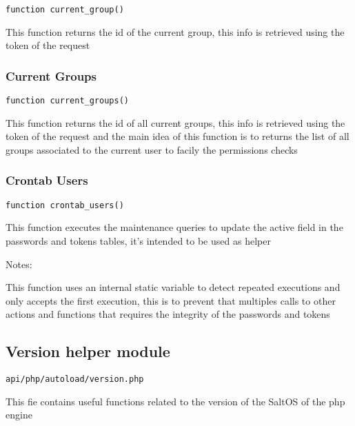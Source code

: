 \documentclass[a4paper]{article}
\begin{document}
\begin{lstlisting}
function current_group()
\end{lstlisting}

This function returns the id of the current group, this info is retrieved
using the token of the request

\hypertarget{toc265}{}
\subsubsection{Current Groups}

\begin{lstlisting}
function current_groups()
\end{lstlisting}

This function returns the id of all current groups, this info is retrieved
using the token of the request and the main idea of this function is to
returns the list of all groups associated to the current user to facily the
permissions checks

\hypertarget{toc266}{}
\subsubsection{Crontab Users}

\begin{lstlisting}
function crontab_users()
\end{lstlisting}

This function executes the maintenance queries to update the active field
in the passwords and tokens tables, it's intended to be used as helper

Notes:

This function uses an internal static variable to detect repeated executions
and only accepts the first execution, this is to prevent that multiples calls
to other actions and functions that requires the integrity of the passwords
and tokens

\hypertarget{toc267}{}
\subsection{Version helper module}

\begin{lstlisting}
api/php/autoload/version.php
\end{lstlisting}

This fie contains useful functions related to the version of the SaltOS of the php engine

\hypertarget{toc268}{}
\end{document}
